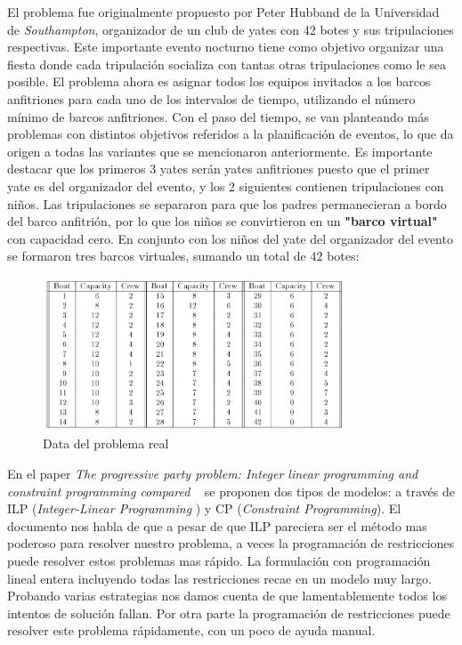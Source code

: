 \documentclass[letter, 10pt]{article}
\begin{document}
El problema fue originalmente propuesto por Peter Hubband de la Universidad de \textit{Southampton}, organizador de un club de yates con 42 botes y sus tripulaciones respectivas. Este importante evento nocturno tiene como objetivo organizar una fiesta donde cada tripulación socializa con tantas otras tripulaciones como le sea posible. El problema ahora es asignar todos los equipos invitados a los barcos anfitriones para cada uno de los intervalos de tiempo, utilizando el número mínimo de barcos anfitriones. Con el paso del tiempo, se van planteando más problemas con distintos objetivos referidos a la planificación de eventos, lo que da origen a todas las variantes que se mencionaron anteriormente. Es importante destacar que los primeros 3 yates serán yates anfitriones puesto que el primer yate es del organizador del evento, y los 2 siguientes contienen tripulaciones con niños. Las tripulaciones se separaron para que los padres permanecieran a bordo del
barco anfitrión, por lo que los niños se convirtieron en un \textbf{"barco virtual"} con capacidad cero. En conjunto con los niños del yate del organizador del evento se formaron tres barcos virtuales, sumando un total de 42 botes:

\begin{figure}[ht]
\centering
 \includegraphics[width=0.8\textwidth]{party5.png}
 \caption{Data del problema real}
\end{figure}

En el paper \textit{The progressive party problem: Integer linear programming and constraint programming compared} ~\cite{Smith1996} se proponen dos tipos de modelos: a través de ILP (\textit{Integer-Linear Programming} ) y CP (\textit{Constraint Programming}). El documento nos habla de que a pesar de que ILP pareciera ser el método mas poderoso para resolver nuestro problema, a veces la programación de restricciones puede resolver estos problemas mas rápido. La formulación con programación lineal entera incluyendo todas las restricciones recae en un modelo muy largo. Probando varias estrategias nos damos cuenta de que lamentablemente todos los intentos de solución fallan. Por otra parte la programación de restricciones puede resolver este problema rápidamente, con un poco de ayuda manual. 
\end{document}
